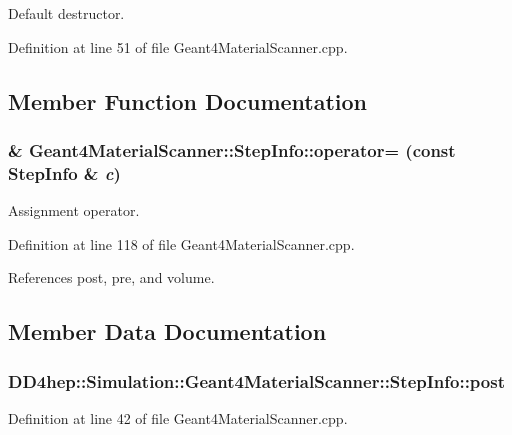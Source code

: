 Default destructor. 

Definition at line 51 of file Geant4MaterialScanner.cpp.

\subsection{Member Function Documentation}
\hypertarget{class_d_d4hep_1_1_simulation_1_1_geant4_material_scanner_1_1_step_info_aa9a39c227e53f039bdd9620b1335bd84}{
\subsubsection[{operator=}]{ \& Geant4MaterialScanner::StepInfo::operator= (const {\bf StepInfo} \& {\em c})}}
\label{class_d_d4hep_1_1_simulation_1_1_geant4_material_scanner_1_1_step_info_aa9a39c227e53f039bdd9620b1335bd84}


Assignment operator. 

Definition at line 118 of file Geant4MaterialScanner.cpp.

References post, pre, and volume.

\subsection{Member Data Documentation}
\hypertarget{class_d_d4hep_1_1_simulation_1_1_geant4_material_scanner_1_1_step_info_a0fd16194cb4eeb622e8e1485d3881688}{
\subsubsection[{post}]{ {\bf DD4hep::Simulation::Geant4MaterialScanner::StepInfo::post}}}
\label{class_d_d4hep_1_1_simulation_1_1_geant4_material_scanner_1_1_step_info_a0fd16194cb4eeb622e8e1485d3881688}


Definition at line 42 of file Geant4MaterialScanner.cpp.


